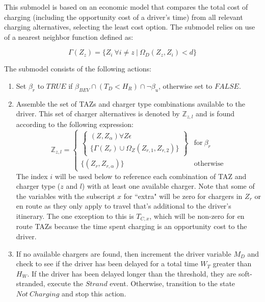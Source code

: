 \documentclass[journal]{IEEEtran}
\begin{document}
This submodel is based on an economic model that compares the total cost of charging (including the opportunity cost of a driver's time) from all relevant charging alternatives, selecting the least cost option. The submodel relies on use of a nearest neighbor function defined as:

\begin{equation}
  \Gamma(Z_z) = \{Z_i ~ \forall {i \ne z} ~ | ~ \Omega_D(Z_z,Z_i) < d\}
\end{equation}

The submodel consists of the following actions:
\begin{enumerate}[label=(\alph*)]
  \item Set $\beta_r$ to $TRUE$ if $\beta_{BEV} \cap (T_D < H_R) \cap \neg \beta_u$, otherwise set to $FALSE$.
  \item Assemble the set of TAZs and charger type combinations available to the driver. This set of charger alternatives is denoted by $\mathbb{Z}_{z,l}$ and is found according to the following expression: 
    \begin{equation}
      \mathbb{Z}_{z,l} = 
      \begin{cases}  
	\left\{ \substack{ (Z,Z_{\alpha}) \forall Z \epsilon \\ \{ \Gamma(Z_r) \cup \Omega_Z(Z_{r,1},Z_{r,2}) \}}
\right\} & \text{for}~ \beta_r \\
	\{(Z_r,Z_{r,\alpha})\} & \text{otherwise}
      \end{cases}
    \end{equation}
    The index $i$ will be used below to reference each combination of TAZ and charger type ($z$ and $l$) with at least one available charger.  Note that some of the variables with the subscript $x$ for ``extra" will be zero for chargers in $Z_r$ or en route as they only apply to travel that's additional to the driver's itinerary.  The one exception to this is $T_{C,x}$, which will be non-zero for en route TAZs because the time spent charging is an opportunity cost to the driver.

  \item If no available chargers are found, then increment the driver variable $M_D$ and check to see if the driver has been delayed for a total time $W_T$ greater than $H_W$.  If the driver has been delayed longer than the threshold, they are soft-stranded, execute the $Strand$ event.  Otherwise, transition to the state $Not ~Charging$ and stop this action.


\end{enumerate}
\end{document}
